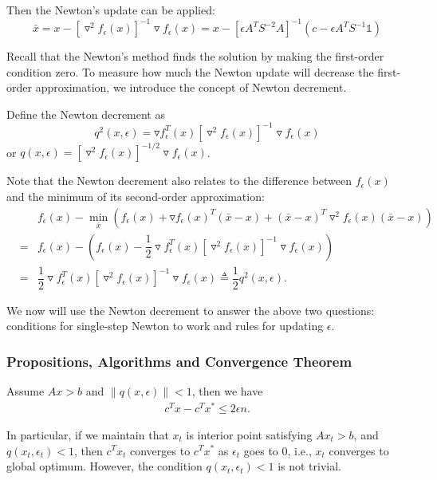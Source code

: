 Then the Newton's update can be applied:
\begin{equation}
\bar{x}=x-[\triangledown^2f_\epsilon(x)]^{-1}\triangledown f_\epsilon(x)=x-[\epsilon A^TS^{-2}A]^{-1}\left(c-\epsilon A^T S^{-1}\mathbb{1}\right)\label{eq:Newton_update}
\end{equation}

Recall that the Newton's method finds the solution by making the first-order condition zero. To measure how much the Newton update will decrease the first-order approximation, we introduce the concept of Newton decrement.

Define the Newton decrement as
\begin{equation}
q^2(x, \epsilon) = \triangledown f^T_\epsilon(x)[\triangledown^2f_\epsilon(x)]^{-1}\triangledown f_\epsilon(x)\label{eq:newton_decrement}
\end{equation}
or $q(x, \epsilon) = [\triangledown^2f_\epsilon(x)]^{-1/2}\triangledown f_\epsilon(x)$. 

Note that the Newton decrement also relates to the difference between $f_\epsilon(x)$ and the minimum of its second-order approximation:
\begin{eqnarray}
&&f_\epsilon(x)-\min_{\bar{x}}\left(f_\epsilon(x)+\triangledown f_\epsilon(x)^T(\bar{x}-x)+(\bar{x}-x)^T\triangledown^2 f_\epsilon(x)(\bar{x}-x)\right)\nonumber\\
&=&f_\epsilon(x)-\left(f_\epsilon(x)-\dfrac{1}{2}\triangledown f^T_\epsilon(x)[\triangledown^2f_\epsilon(x)]^{-1}\triangledown f_\epsilon(x)\right)\nonumber\\
&=&\dfrac{1}{2}\triangledown f^T_\epsilon(x)[\triangledown^2f_\epsilon(x)]^{-1}\triangledown f_\epsilon(x)\triangleq \dfrac{1}{2}q^2(x, \epsilon).
\end{eqnarray}

We now will use the Newton decrement to answer the above two questions: conditions for single-step Newton to work and rules for updating $\epsilon$.

\subsubsection{Propositions, Algorithms and Convergence Theorem}
\begin{proposition}\label{prop1}
Assume $Ax > b$ and $\|q(x, \epsilon)\|<1$, then we have
\begin{align}
c^Tx-c^Tx^{*}\leq 2\epsilon n.
\end{align}
\end{proposition}
In particular, if we maintain that $x_t$ is interior point satisfying $Ax_t>b$,
and $q(x_t, \epsilon_t) < 1$, then $c^{T}x_t$ converges to $c^Tx^*$ as $\epsilon_t$ goes to $0$, i.e., $x_t$ converges to global optimum. However, the condition $q(x_t,\epsilon_t)<1$ is not trivial.  

